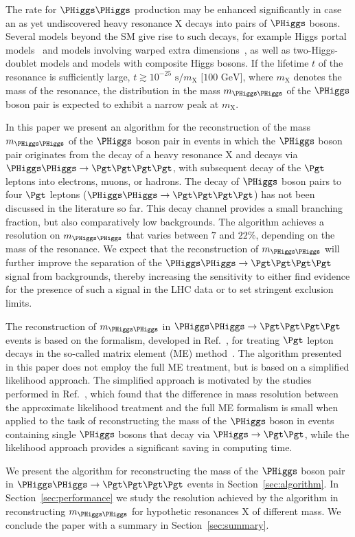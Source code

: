 The rate for $\PHiggs\PHiggs$ production may be enhanced significantly in case an as yet undiscovered heavy resonance $\textrm{X}$ decays into pairs of $\PHiggs$ bosons.
Several models beyond the SM give rise to such decays, 
for example Higgs portal models~\cite{Englert:2011yb,No:2013wsa} and models involving warped extra dimensions~\cite{Randall:1999ee},
as well as two-Higgs-doublet models and models with composite Higgs bosons.
If the lifetime $t$ of the resonance is sufficiently large, $t \gtrsim 10^{-25}\textrm{~s}/m_{\textrm{X}}\textrm{~[100~GeV]}$, 
where $m_{\textrm{X}}$ denotes the mass of the resonance, 
the distribution in the mass $m_{\PHiggs\PHiggs}$ of the $\PHiggs$ boson pair is expected to exhibit a narrow peak at $m_{\textrm{X}}$.

In this paper we present an algorithm for the reconstruction of the mass $m_{\PHiggs\PHiggs}$ of the $\PHiggs$ boson pair 
in events in which the $\PHiggs$ boson pair originates from the decay of a heavy resonance $\textrm{X}$ and decays via $\PHiggs\PHiggs \to \Pgt\Pgt\Pgt\Pgt$,
with subsequent decay of the $\Pgt$ leptons into electrons, muons, or hadrons.
The decay of $\PHiggs$ boson pairs to four $\Pgt$ leptons ($\PHiggs\PHiggs \to \Pgt\Pgt\Pgt\Pgt$) has not been discussed in the literature so far.
This decay channel provides a small branching fraction, but also comparatively low backgrounds.
The algorithm achieves a resolution on $m_{\PHiggs\PHiggs}$ that varies between $7$ and $22\%$,
depending on the mass of the resonance.
We expect that the reconstruction of $m_{\PHiggs\PHiggs}$ will further improve the separation of the $\PHiggs\PHiggs \to \Pgt\Pgt\Pgt\Pgt$ signal from backgrounds,
thereby increasing the sensitivity to either find evidence for the presence of such a signal in the LHC data or to set stringent exclusion limits.

The reconstruction of $m_{\PHiggs\PHiggs}$ in $\PHiggs\PHiggs \to \Pgt\Pgt\Pgt\Pgt$ events is based on the formalism,
developed in Ref.~\cite{SVfitMEM}, for treating $\Pgt$ lepton decays in the so-called matrix element (ME) method~\cite{Kondo:1988yd,Kondo:1991dw}.
The algorithm presented in this paper does not employ the full ME treatment,
but is based on a simplified likelihood approach.
The simplified approach is motivated by the studies performed in Ref.~\cite{SVfitMEM}, 
which found that the difference in mass resolution between the approximate likelihood treatment and the full ME formalism 
is small when applied to the task of reconstructing the mass of the $\PHiggs$ boson in events containing single $\PHiggs$ bosons that decay via $\PHiggs \to \Pgt\Pgt$,
while the likelihood approach provides a significant saving in computing time.

We present the algorithm for reconstructing the mass of the $\PHiggs$ boson pair 
in $\PHiggs\PHiggs \to \Pgt\Pgt\Pgt\Pgt$ events in Section~\ref{sec:algorithm}.
In Section~\ref{sec:performance} we study the resolution achieved by the algorithm
in reconstructing $m_{\PHiggs\PHiggs}$ for hypothetic resonances $\textrm{X}$ of different mass.
We conclude the paper with a summary in Section~\ref{sec:summary}.
